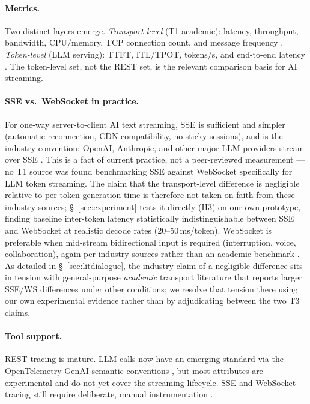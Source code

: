 \documentclass[11pt]{article}
\begin{document}
\paragraph{Metrics.} Two distinct layers emerge. \emph{Transport-level} (T1 academic): latency, throughput, bandwidth, CPU/memory, TCP connection count, and message frequency \cite{ws2014,ws2019,murley2021}. \emph{Token-level} (LLM serving): TTFT, ITL/TPOT, tokens/s, and end-to-end latency \cite{arxivserving2025,chiron2025}. The token-level set, not the REST set, is the relevant comparison basis for AI streaming.

\paragraph{SSE vs.\ WebSocket in practice.} For one-way server-to-client AI text streaming, SSE is sufficient and simpler (automatic reconnection, CDN compatibility, no sticky sessions), and is the industry convention: OpenAI, Anthropic, and other major LLM providers stream over SSE \cite{buildmvpfast2026,procedure2026}. This is a fact of current practice, not a peer-reviewed measurement --- no T1 source was found benchmarking SSE against WebSocket specifically for LLM token streaming. The claim that the transport-level difference is negligible relative to per-token generation time is therefore not taken on faith from these industry sources; \S~\ref{sec:experiment} tests it directly (H3) on our own prototype, finding baseline inter-token latency statistically indistinguishable between SSE and WebSocket at realistic decode rates (20--50\,ms/token). WebSocket is preferable when mid-stream bidirectional input is required (interruption, voice, collaboration), again per industry sources rather than an academic benchmark \cite{oneuptimews2026,getstream2026}. As detailed in \S~\ref{sec:litdialogue}, the industry claim of a negligible difference sits in tension with general-purpose \emph{academic} transport literature that reports larger SSE/WS differences under other conditions; we resolve that tension there using our own experimental evidence rather than by adjudicating between the two T3 claims.

\paragraph{Tool support.} REST tracing is mature. LLM calls now have an emerging standard via the OpenTelemetry GenAI semantic conventions \cite{otelgenai2026}, but most attributes are experimental and do not yet cover the streaming lifecycle. SSE and WebSocket tracing still require deliberate, manual instrumentation \cite{oneuptimesse2026,oneuptimews2026,alibabaws2026}.
\end{document}
